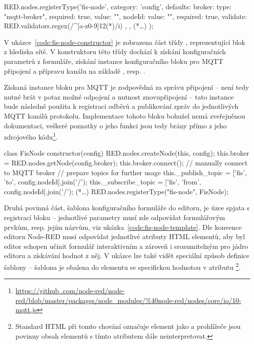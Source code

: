 \begin{code}[
    language=Javascript,
    label=code:fis-node-editor,
    caption={Registrace vlastního bloku do editoru sítě v nástroji Node-RED.}
]
RED.nodes.registerType('fis-node', {
    category: 'config',
    defaults: {
        broker: {type: "mqtt-broker", required: true, value: ""},
        nodeId: {
            value: "", required: true,
            validate: RED.validators.regex(/^[a-z0-9]{12}(*\textdollar*)/i)
        },
    },
    (*\ldots*)
});
\end{code}

V ukázce~\ref{code:fis-node-constructor} je zobrazena část třídy , reprezentující blok z hlediska sítě. V
konstruktoru této třídy dochází k získání konfiguračních
parametrů z formuláře, získání instance konfiguračního bloku pro MQTT připojení a přípravu kanálu na základě
, resp. .

Získaná instance bloku pro MQTT je zodpovědná za správu připojení -- není tedy nutné brát v potaz možné odpojení a
nutnost znovupřipojení -- tato instance bude následně použita k registraci odběrů a publikování zpráv do jednotlivých
MQTT kanálů protokolu.
Implementace tohoto bloku bohužel nemá zveřejněnou dokumentaci, veškeré poznatky o jeho funkci jsou tedy brány přímo
z jeho zdrojového kódu\footnote{\url{https://github
.com/node-red/node-red/blob/master/packages/node_modules/\%40node-red/nodes/core/io/10-mqtt.js}}.

\begin{code}[
    language=Javascript,
    numbers=left,
    label=code:fis-node-constructor,
    caption={Část konstruktoru třídy \ic{FisNode} obluhující připojení MQTT brokeru a přípravu kanálů pro komunikaci.}
]
class FisNode {
    constructor(config) {
        RED.nodes.createNode(this, config);
        this.broker = RED.nodes.getNode(config.broker);
        this.broker.connect(); // manually connect to MQTT broker
        // prepare topics for further usage
        this._publish_topic = ['fis', 'to', config.nodeId].join('/');
        this._subscribe_topic = ['fis', 'from', config.nodeId].join('/');
    }
    (*\ldots*)
    RED.nodes.registerType("fis-node", FisNode);
}
\end{code}

Druhá povinná část, šablona konfiguračního formuláře do editoru, je úzce spjata s registrací bloku -- jednotlivé
parametry musí zde odpovídat formulářovým prvkům, resp. jejím názvům, viz ukázka~\ref{code:fis-node-template}.
Dle konvence editoru Node-RED musí odpovídat jednotlivé atributy HTML elementů, aby byl editor schopen učinit
formulář interaktivním a zároveň i srozumitelným pro jádro editoru a získávání hodnot z něj.
V ukázce lze také vidět speciální způsob definice šablony -- šablona je obalena do elementu  se
specifickou hodnotou v atributu \footnote{Standard HTML při tomto chování označuje
element  jako  a prohlížeče jsou povinny obsah elementů s tímto atributem dále
neinterpretovat.}.

